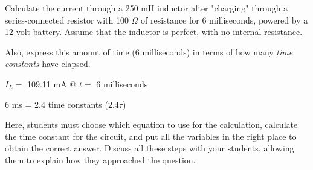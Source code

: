 

Calculate the current through a 250 mH inductor after "charging" through a series-connected resistor with 100 $\Omega$ of resistance for 6 milliseconds, powered by a 12 volt battery.  Assume that the inductor is perfect, with no internal resistance.

Also, express this amount of time (6 milliseconds) in terms of how many {\it time constants} have elapsed.







$I_L =$ 109.11 mA @ $t =$ 6 milliseconds

\vskip 10pt

6 ms = 2.4 time constants ($2.4\tau$)







Here, students must choose which equation to use for the calculation, calculate the time constant for the circuit, and put all the variables in the right place to obtain the correct answer.  Discuss all these steps with your students, allowing them to explain how they approached the question.




